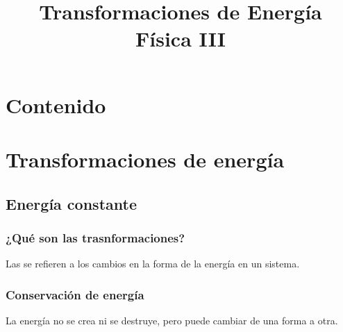 \documentclass[14pt]{beamer}
\title{\Large{Transformaciones de Energía} \\ \normalsize{Física III}}
\date{}
\begin{document}
\maketitle

\section*{Contenido}

\section{Transformaciones de energía}
\subsection{Energía constante}

\begin{frame}
\frametitle{¿Qué son las trasnformaciones?}
Las  se refieren a los cambios en la forma de la energía en un sistema.
\end{frame}
\begin{frame}
\frametitle{Conservación de energía}
La energía no se crea ni se destruye, pero puede cambiar de una forma a otra.
\end{frame}
\end{document}
